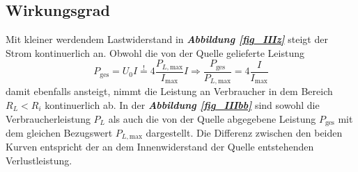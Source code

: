 \subsection{Wirkungsgrad}
Mit kleiner werdendem Lastwiderstand in \textbf{\textit{Abbildung \ref{fig_IIIz}}} steigt der Strom kontinuerlich an. Obwohl die von der Quelle gelieferte Leistung 
\begin{equation}
\boxed{P_{\text{ges}}=U_0I\stackrel{!}{=}4\dfrac{P_{L,\text{max}}}{I_{\text{max}}}I\Longrightarrow \dfrac{P_{\text{ges}}}{P_{L,\text{max}}}=4\dfrac{I}{I_{\text{max}}}}
\end{equation}
damit ebenfalls ansteigt, nimmt die Leistung an Verbraucher in dem Bereich $R_L<R_i$ kontinuerlich ab. In der \textbf{\textit{Abbildung \ref{fig_IIIbb}}} sind sowohl die Verbraucherleistung $P_L$ als auch die von der Quelle abgegebene Leistung $P_{\text{ges}}$ mit dem gleichen Bezugswert $P_{L,\text{max}}$ dargestellt. Die Differenz zwischen den beiden Kurven entspricht der an dem Innenwiderstand der Quelle entstehenden Verlustleistung.
